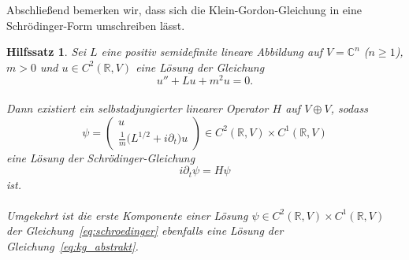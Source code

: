 \documentclass[11pt,a4paper,leqno]{report}
\newtheorem{lemma}[theorem]{Hilfssatz}
\numberwithin{equation}{chapter}
\begin{document}
\noindent
Abschließend bemerken wir, dass sich die Klein-Gordon-Gleichung 
in eine Schrödinger-Form umschreiben lässt. 
\begin{lemma}\label{lem:schroedingerform}
	Sei $L$ eine positiv semidefinite lineare Abbildung auf $V = \mathbb{C}^n$ 
	($n \geq 1$), $m > 0$ und $u \in C^2(\mathbb{R}, V)$ eine Lösung der Gleichung
	\begin{equation}\label{eq:kg_abstrakt}
		u'' + L u + m^2 u = 0.
	\end{equation}
	\\
	Dann existiert ein selbstadjungierter linearer Operator $H$ auf $V \oplus V$, 
	sodass
	\begin{equation}\label{eq:psi_def}
		\psi = \begin{pmatrix}
			u \\[4pt]
			\frac{1}{m}\bigl(L^{1/2} + i \partial_t\bigr) u
		\end{pmatrix}
		\in C^2(\mathbb{R}, V) \times C^1(\mathbb{R}, V)
	\end{equation}
	eine Lösung der Schrödinger-Gleichung
	\begin{equation}\label{eq:schroedinger}
		i \partial_t \psi = H \psi
	\end{equation}
	ist. \\
	\\
	Umgekehrt ist die erste Komponente einer Lösung 
	$\psi \in C^2(\mathbb{R}, V) \times C^1(\mathbb{R}, V)$ 
	der Gleichung~\eqref{eq:schroedinger} ebenfalls eine Lösung 
	der Gleichung~\eqref{eq:kg_abstrakt}.
\end{lemma}
\end{document}
